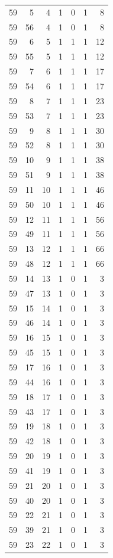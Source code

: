 \begin{longtable}{rrrrrrr}
59 & 5 & 4 & 1 & 0 & 1 & 8\\
59 & 56 & 4 & 1 & 0 & 1 & 8\\
59 & 6 & 5 & 1 & 1 & 1 & 12\\
59 & 55 & 5 & 1 & 1 & 1 & 12\\
59 & 7 & 6 & 1 & 1 & 1 & 17\\
59 & 54 & 6 & 1 & 1 & 1 & 17\\
59 & 8 & 7 & 1 & 1 & 1 & 23\\
59 & 53 & 7 & 1 & 1 & 1 & 23\\
59 & 9 & 8 & 1 & 1 & 1 & 30\\
59 & 52 & 8 & 1 & 1 & 1 & 30\\
59 & 10 & 9 & 1 & 1 & 1 & 38\\
59 & 51 & 9 & 1 & 1 & 1 & 38\\
59 & 11 & 10 & 1 & 1 & 1 & 46\\
59 & 50 & 10 & 1 & 1 & 1 & 46\\
59 & 12 & 11 & 1 & 1 & 1 & 56\\
59 & 49 & 11 & 1 & 1 & 1 & 56\\
59 & 13 & 12 & 1 & 1 & 1 & 66\\
59 & 48 & 12 & 1 & 1 & 1 & 66\\
59 & 14 & 13 & 1 & 0 & 1 & 3\\
59 & 47 & 13 & 1 & 0 & 1 & 3\\
59 & 15 & 14 & 1 & 0 & 1 & 3\\
59 & 46 & 14 & 1 & 0 & 1 & 3\\
59 & 16 & 15 & 1 & 0 & 1 & 3\\
59 & 45 & 15 & 1 & 0 & 1 & 3\\
59 & 17 & 16 & 1 & 0 & 1 & 3\\
59 & 44 & 16 & 1 & 0 & 1 & 3\\
59 & 18 & 17 & 1 & 0 & 1 & 3\\
59 & 43 & 17 & 1 & 0 & 1 & 3\\
59 & 19 & 18 & 1 & 0 & 1 & 3\\
59 & 42 & 18 & 1 & 0 & 1 & 3\\
59 & 20 & 19 & 1 & 0 & 1 & 3\\
59 & 41 & 19 & 1 & 0 & 1 & 3\\
59 & 21 & 20 & 1 & 0 & 1 & 3\\
59 & 40 & 20 & 1 & 0 & 1 & 3\\
59 & 22 & 21 & 1 & 0 & 1 & 3\\
59 & 39 & 21 & 1 & 0 & 1 & 3\\
59 & 23 & 22 & 1 & 0 & 1 & 3\\

\end{longtable}
